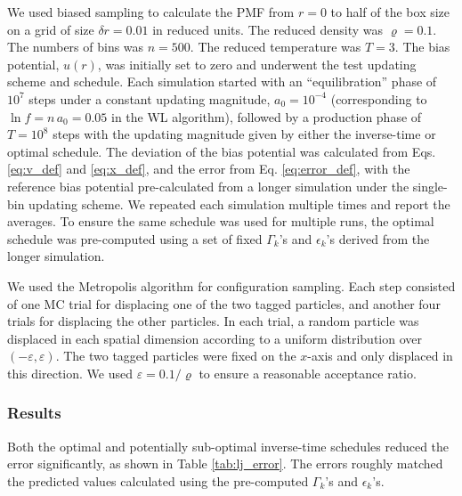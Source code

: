 \documentclass[reprint, superscriptaddress, floatfix]{revtex4-1}
\begin{document}
We used biased sampling to calculate
the PMF from $r = 0$ to half of the box size
on a grid of size $\delta r = 0.01$ in reduced units.
%
The reduced density was $\varrho = 0.1$.
The numbers of bins was $n = 500$.
The reduced temperature was $T = 3$.
%
The bias potential, $u(r)$,
was initially set to zero and
underwent the test updating scheme and schedule.
%
Each simulation started with an ``equilibration'' phase
of $10^7$ steps under a constant updating magnitude,
$a_0 = 10^{-4}$
(corresponding to $\ln f = n \, a_0 = 0.05$ in the WL algorithm),
followed by a production phase of
$T = 10^8$ steps
with the updating magnitude given by
either the inverse-time or optimal schedule.
%
The deviation of the bias potential was calculated from
Eqs. \eqref{eq:v_def} and \eqref{eq:x_def},
and the error from Eq. \eqref{eq:error_def},
with the reference bias potential
pre-calculated from a longer simulation
under the single-bin updating scheme.
%
We repeated each simulation multiple times
and report the averages.
%
To ensure the same schedule was used for multiple runs,
the optimal schedule was pre-computed using a set of fixed
$\Gamma_k$'s and $\epsilon_k$'s derived from the longer simulation.

We used the Metropolis algorithm\cite{frenkel, metropolis1953}
for configuration sampling.
%
Each step consisted of
one MC trial for displacing one of the two tagged particles,
and another four trials for displacing the other particles.
%
In each trial,
a random particle was displaced in each spatial dimension
according to a uniform distribution over $(-\varepsilon, \varepsilon)$.
%
The two tagged particles were fixed on the $x$-axis
and only displaced in this direction.
%
We used $\varepsilon = 0.1/\varrho$
to ensure a reasonable acceptance ratio.



\subsubsection{Results}




Both the optimal and potentially sub-optimal inverse-time schedules
reduced the error significantly,
as shown in Table \ref{tab:lj_error}.
%
The errors roughly matched the predicted values
calculated using the pre-computed
$\Gamma_k$'s and $\epsilon_k$'s.
%
\end{document}
